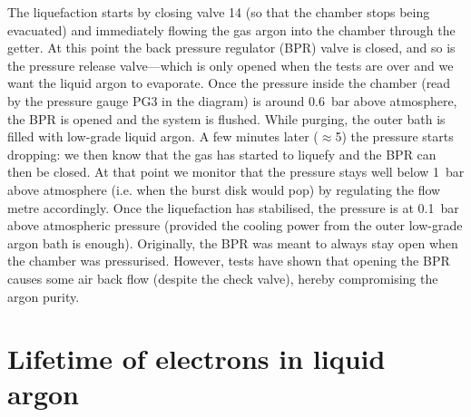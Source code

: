 \documentclass[a4paper,11pt]{article}
\begin{document}
The liquefaction starts by closing valve 14 (so that the chamber stops being evacuated) and immediately flowing the gas argon into the chamber through the getter. At this point the back pressure regulator (BPR) valve is closed, and so is the pressure release valve---which is only opened when the tests are over and we want the liquid argon to evaporate. Once the pressure inside the chamber (read by the pressure gauge PG3 in the diagram) is around \SI{0.6}{bar} above atmosphere, the BPR is opened and the system is flushed. While purging, the outer bath is filled with low-grade liquid argon. A few minutes later ($\approx$5) the pressure starts dropping: we then know that the gas has started to liquefy and the BPR can then be closed. At that point we monitor that the pressure stays well below \SI{1}{bar} above atmosphere (i.e. when the burst disk would pop) by regulating the flow metre accordingly. Once the liquefaction has stabilised, the pressure is at \SI{0.1}{bar} above atmospheric pressure (provided the cooling power from the outer low-grade argon bath is enough). Originally, the BPR was meant to always stay open when the chamber was pressurised. However, tests have shown that opening the BPR causes some air back flow (despite the check valve), hereby compromising the argon purity.

\section{Lifetime of electrons in liquid argon}

\end{document}
